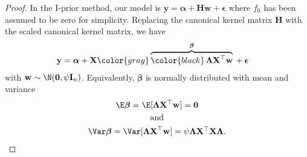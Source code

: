 \begin{proof}
	In the I-prior method, our model is $\mathbf y = \boldsymbol{\alpha} + \mathbf H\mathbf w + \boldsymbol{\epsilon}$ where $f_0$ has been assumed to be zero for simplicity. Replacing the canonical kernel matrix $\mathbf H$ with the scaled canonical kernel matrix, we have
	\begin{align*}
		\mathbf y &= \boldsymbol{\alpha} 
		+ \mathbf X {\color{gray} \overbrace{{\color{black} \, \boldsymbol\Lambda \mathbf X^\top \mathbf w}}^{\boldsymbol{\beta}} \, } 
		+ \boldsymbol{\epsilon}
	\end{align*}
	with $\mathbf w \sim \N(\mathbf 0, \psi\mathbf I_n)$. Equivalently, $\boldsymbol{\beta}$ is normally distributed with mean and variance
	\begin{align*}
		\begin{gathered}
			\E\boldsymbol{\beta} = \E[\boldsymbol\Lambda \mathbf X^\top \mathbf w] = \mathbf 0 \\
			\text{and} \\
			\Var\boldsymbol{\beta} = \Var[\boldsymbol\Lambda \mathbf X^\top \mathbf w] = \psi\boldsymbol\Lambda \mathbf X ^\top \mathbf X \boldsymbol\Lambda.
		\end{gathered}	
	\end{align*}
\end{proof}